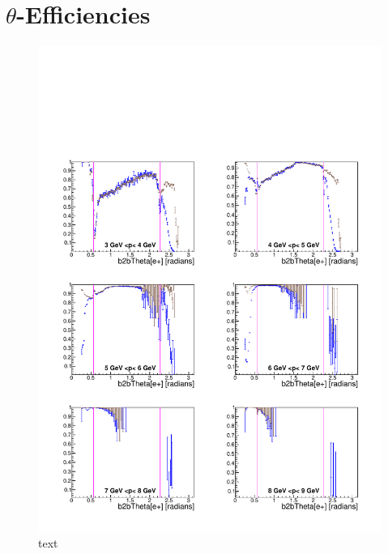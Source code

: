 \documentclass[a4paper,11pt,twosided,final,german,openbib,pdftex,listof=totoc,bibliography=totoc]{scrbook}
\begin{document}
\section{$\theta$-Efficiencies}


\begin{figure}[!htbp]
	\centering
	\includegraphics[width=\textwidth]{Plots/comp/cMThetaem_Data.pdf}
	\caption[text]{text}
	\label{plt:compThetaem}
\end{figure}
\end{document}
